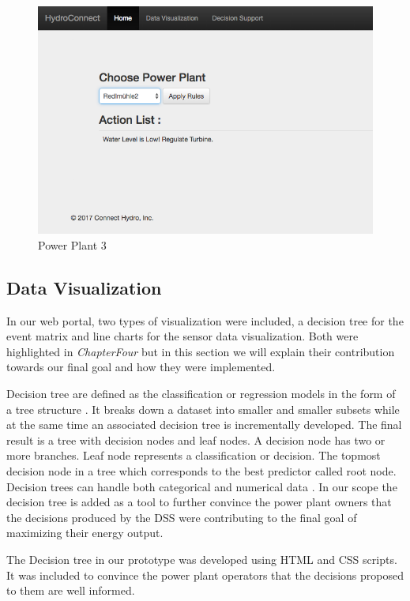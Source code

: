 \begin{figure}[H]
\centering
\includegraphics[scale=0.58]{Images/Screen3.png}
\caption[Power Plant 3]{Power Plant 3}
\end{figure}
\subsection{Data Visualization}
\label{subsec:DataVisualization}
In our web portal, two types of visualization were included, a decision tree for the event matrix and line charts for the sensor data visualization. Both were highlighted in \textit{ChapterFour} but in this section we will explain their contribution towards our final goal and how they were implemented.

Decision tree are defined as the classification or regression models in the form of a tree structure \cite{DecisionTree}. It breaks down a dataset into smaller and smaller subsets while at the same time an associated decision tree is incrementally developed. The final result is a tree with decision nodes and leaf nodes. A decision node has two or more branches. Leaf node represents a classification or decision. The topmost decision node in a tree which corresponds to the best predictor called root node. Decision trees can handle both categorical and numerical data \cite{DecisionTree}. In our scope the decision tree is added as a tool to further convince the power plant owners that the decisions produced by the DSS were contributing to the final goal of maximizing their energy output. 

The Decision tree in our prototype was developed using HTML and CSS scripts. It was included to convince the power plant operators that the decisions proposed to them are well informed.

